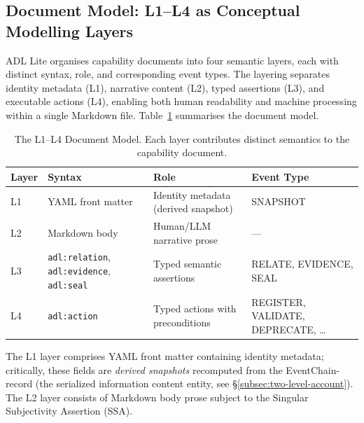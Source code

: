 
\subsection{Document Model: L1--L4 as Conceptual Modelling Layers}\label{subsec:document-model}

ADL Lite organises capability documents into four semantic layers, each with distinct syntax, role, and corresponding event types. The layering separates identity metadata (L1), narrative content (L2), typed assertions (L3), and executable actions (L4), enabling both human readability and machine processing within a single Markdown file. Table~\ref{tab:document-model} summarises the document model.

\begin{table}[htbp]
\centering
\small
\caption{The L1--L4 Document Model. Each layer contributes distinct semantics to the capability document.}
\label{tab:document-model}
\begin{tabular}{@{}p{1.2cm}p{3.2cm}p{4cm}p{4.5cm}@{}}
\toprule
\textbf{Layer} & \textbf{Syntax} & \textbf{Role} & \textbf{Event Type} \\
\midrule
L1 & YAML front matter & Identity metadata (derived snapshot) & SNAPSHOT \\
L2 & Markdown body & Human/LLM narrative prose & --- \\
L3 & \texttt{adl:relation}, \texttt{adl:evidence}, \texttt{adl:seal} & Typed semantic assertions & RELATE, EVIDENCE, SEAL \\
L4 & \texttt{adl:action} & Typed actions with preconditions & REGISTER, VALIDATE, DEPRECATE, \ldots \\
\bottomrule
\end{tabular}
\end{table}

The L1 layer comprises YAML front matter containing identity metadata; critically, these fields are \emph{derived snapshots} recomputed from the EventChain-record (the serialized information content entity, see \S\ref{subsec:two-level-account}). The L2 layer consists of Markdown body prose subject to the Singular Subjectivity Assertion (SSA).

